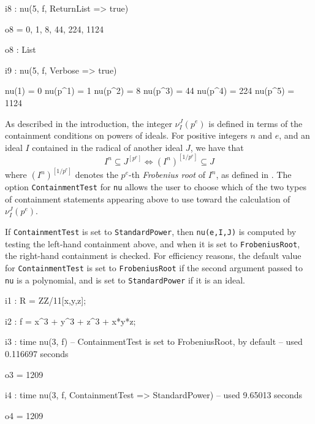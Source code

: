 \documentclass{amsart}
\begin{document}
{\small
{}
\begin{MyVerbatim}

i8 : nu(5, f, ReturnList => true)

o8 = {0, 1, 8, 44, 224, 1124}

o8 : List

i9 : nu(5, f, Verbose => true)

     nu(1) = 0
     nu(p^1) = 1
     nu(p^2) = 8
     nu(p^3) = 44
     nu(p^4) = 224
     nu(p^5) = 1124
\end{MyVerbatim}
}
\medspace


As described in the introduction, the integer $\nu_I^J(p^e)$ is defined in terms of the containment conditions on powers of ideals.
For positive integers $n$ and $e$, and an ideal $I$ contained in the radical of another ideal $J$, we have that
\begin{equation*}
  I^n \subseteq J^{[p^e]} \Longleftrightarrow (I^n)^{[1/p^e]} \subseteq J
\end{equation*}
where $(I^n)^{[1/p^e]}$ denotes the $p^e$-th \emph{Frobenius root} of $I^n$, as defined in \cite{BlickleMustataSmithDiscretenessAndRationalityOfFThresholds}.
The option {\tt ContainmentTest} for {\tt nu} allows the user to choose which of the two types of containment statements appearing above to use toward the calculation of $\nu_I^J(p^e)$.

If {\tt ContainmentTest} is set to {\tt StandardPower}, then {\tt nu(e,I,J)} is computed by testing the left-hand containment above, and when it is set to {\tt FrobeniusRoot}, the right-hand containment is checked.
For efficiency reasons, the default value for {\tt ContainmentTest} is set to  {\tt FrobeniusRoot} if the second argument passed to {\tt nu} is a polynomial, and is set to {\tt StandardPower} if it is an ideal.

{\small
{}
\begin{MyVerbatim}

i1 : R = ZZ/11[x,y,z];

i2 : f = x^3 + y^3 + z^3 + x*y*z;

i3 : time nu(3, f) -- ContainmentTest is set to FrobeniusRoot, by default
     -- used 0.116697 seconds

o3 = 1209

i4 : time nu(3, f, ContainmentTest => StandardPower)
     -- used 9.65013 seconds

o4 = 1209
\end{MyVerbatim}
}
\medspace
\end{document}
